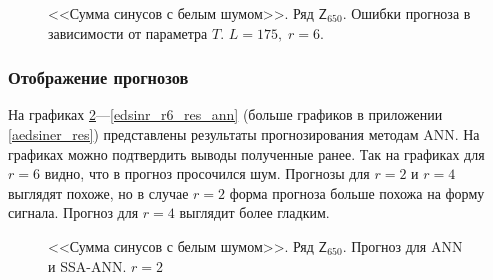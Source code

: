 \documentclass[specialist,
               substylefile = spbu.rtx,
               subf,href,colorlinks=true, 12p]{disser}
\newcommand{\multiref}[2]{\ref{#1}---\ref{#2}}
\begin{document}
\begin{figure}[H]
	\captionsetup{justification=centering}
	\caption{<<Сумма синусов с белым шумом>>. Ряд $\mathsf{Z}_{650}$. Ошибки прогноза в зависимости от параметра $T$. $L = 175, \; r = 6$.}
	\label{edsinr_r6}
\end{figure}

\subsubsection{Отображение прогнозов}
\label{edsiner_res}

На графиках \multiref{edsinr_r2_res_ann}{edsinr_r6_res_ann} (больше графиков в приложении \ref{aedsiner_res}) представлены результаты прогнозирования методам ANN. На графиках можно подтвердить выводы полученные ранее. Так на графиках для $r = 6$ видно, что в прогноз просочился шум. Прогнозы для $r = 2$ и $r = 4$ выглядят похоже, но в случае $r = 2$ форма прогноза больше похожа на форму сигнала.
Прогноз для $r = 4$ выглядит более гладким.

\begin{figure}[H]
	\captionsetup{justification=centering}
	\caption{<<Сумма синусов с белым шумом>>. Ряд $\mathsf{Z}_{650}$. Прогноз для ANN и SSA-ANN. $r = 2$}
	\label{edsinr_r2_res_ann}
\end{figure}
\end{document}
